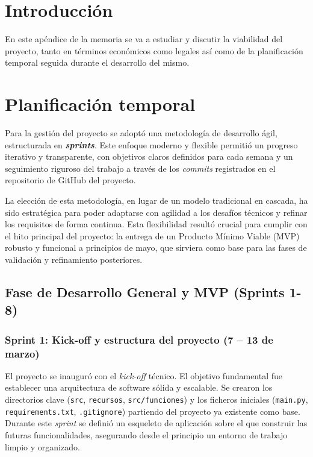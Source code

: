 
\section{Introducción}
En este apéndice de la memoria se va a estudiar y discutir la viabilidad del proyecto, tanto en términos económicos como legales así como de la planificación temporal seguida durante el desarrollo del mismo.

\section{Planificación temporal}

Para la gestión del proyecto se adoptó una metodología de desarrollo ágil, estructurada en \textbf{\textit{sprints}}. Este enfoque moderno y flexible permitió un progreso iterativo y transparente, con objetivos claros definidos para cada semana y un seguimiento riguroso del trabajo a través de los \textit{commits} registrados en el repositorio de GitHub del proyecto.

La elección de esta metodología, en lugar de un modelo tradicional en cascada, ha sido estratégica para poder adaptarse con agilidad a los desafíos técnicos y refinar los requisitos de forma continua. Esta flexibilidad resultó crucial para cumplir con el hito principal del proyecto: la entrega de un Producto Mínimo Viable (MVP) robusto y funcional a principios de mayo, que sirviera como base para las fases de validación y refinamiento posteriores.

\subsection{\textbf{Fase de Desarrollo General y MVP (Sprints 1-8)}}


\subsubsection{Sprint 1: Kick-off y estructura del proyecto (7 – 13 de marzo)}


El proyecto se inauguró con el \textit{kick-off} técnico. El objetivo fundamental fue establecer una arquitectura de software sólida y escalable. Se crearon los directorios clave (\verb|src|, \verb|recursos|, \verb|src/funciones|) y los ficheros iniciales (\verb|main.py|, \verb|requirements.txt|, \verb|.gitignore|) partiendo del proyecto ya existente como base. Durante este \textit{sprint} se definió un esqueleto de aplicación sobre el que construir las futuras funcionalidades, asegurando desde el principio un entorno de trabajo limpio y organizado.


